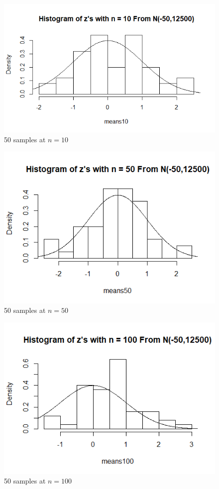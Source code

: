 \documentclass[12pt]{article}
\begin{document}
\begin{figure}[H]
	\centering
	\includegraphics[scale = 0.6]{img/problem4/Rplot_4a.png}
	\caption{50 samples at $n=10$}
\end{figure}

\begin{figure}[H]
	\centering
	\includegraphics[scale = 0.6]{img/problem4/Rplot_4b.png}
	\caption{50 samples at $n=50$}
\end{figure}

\begin{figure}[H]
	\centering
	\includegraphics[scale = 0.6]{img/problem4/Rplot_4c.png}
	\caption{50 samples at $n=100$}
\end{figure}
\end{document}
